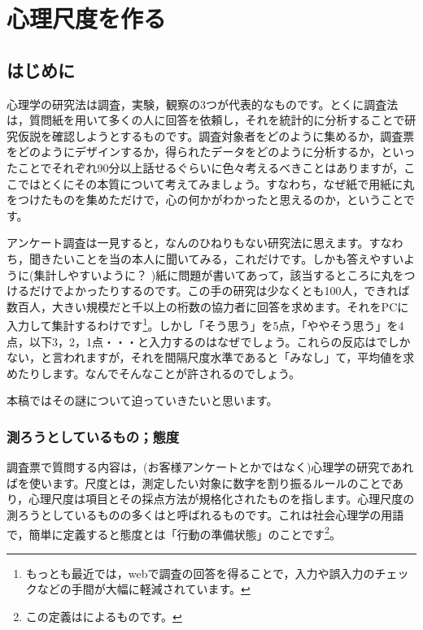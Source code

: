\documentclass{ltjsbook}
\begin{document}
\chapter{心理尺度を作る}
\label{x02_testTheory}
\section{はじめに}
心理学の研究法は調査，実験，観察の3つが代表的なものです。とくに調査法は，質問紙を用いて多くの人に回答を依頼し，それを統計的に分析することで研究仮説を確認しようとするものです。調査対象者をどのように集めるか，調査票をどのようにデザインするか，得られたデータをどのように分析するか，といったことでそれぞれ90分以上話せるぐらいに色々考えるべきことはありますが，ここではとくにその本質について考えてみましょう。すなわち，なぜ紙で用紙に丸をつけたものを集めただけで，心の何かがわかったと思えるのか，ということです。

アンケート調査は一見すると，なんのひねりもない研究法に思えます。すなわち，聞きたいことを当の本人に聞いてみる，これだけです。しかも答えやすいように(集計しやすいように？ )紙に問題が書いてあって，該当するところに丸をつけるだけでよかったりするのです。この手の研究は少なくとも100人，できれば数百人，大きい規模だと千以上の桁数の協力者に回答を求めます。それをPCに入力して集計するわけです\footnote{もっとも最近では，webで調査の回答を得ることで，入力や誤入力のチェックなどの手間が大幅に軽減されています。}。しかし「そう思う」を5点，「ややそう思う」を4点，以下3，2，1点・・・と入力するのはなぜでしょう。これらの反応はでしかない，と言われますが，それを間隔尺度水準であると「みなし」て，平均値を求めたりします。なんでそんなことが許されるのでしょう。

本稿ではその謎について迫っていきたいと思います。
\subsection{測ろうとしているもの；態度}
調査票で質問する内容は，(お客様アンケートとかではなく)心理学の研究であればを使います。尺度とは，測定したい対象に数字を割り振るルールのことであり，心理尺度は項目とその採点方法が規格化されたものを指します。心理尺度の測ろうとしているものの多くはと呼ばれるものです。これは社会心理学の用語で，簡単に定義すると態度とは「行動の準備状態」のことです\footnote{この定義は\textcite{Allport1935}によるものです。}。
\end{document}
